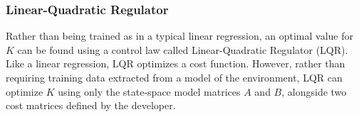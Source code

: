 \documentclass[12pt]{article}
\begin{document}
\subsubsection{Linear-Quadratic Regulator}

Rather than being trained as in a typical linear regression, an optimal value for $K$ can be found using a control law called Linear-Quadratic Regulator (LQR). Like a linear regression, LQR optimizes a cost function. However, rather than requiring training data extracted from a model of the environment, LQR can optimize $K$ using only the state-space model matrices $A$ and $B$, alongside two cost matrices defined by the developer.

\printbibliography
\end{document}
